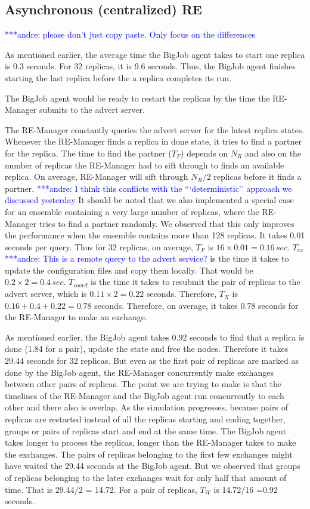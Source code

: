 \documentclass{rspublic}
\newcommand{\alnote}[1]{ {\textcolor{blue} { ***andre: #1 }}}
\newcommand{\alnote}[1]{}
\begin{document}
\subsection{Asynchronous (centralized) RE}
\alnote{please don't just copy paste. Only focus on the differences}

As mentioned earlier, the average time the BigJob agent takes to
start one replica is 0.3 seconds. For 32 replicas, it is 9.6
seconds. Thus, the BigJob agent finishes starting the last replica before the a replica completes its run. 

The BigJob agent
would be ready to restart the replicas by the time the RE-Manager
submits to the advert server. %

The RE-Manager constantly
queries the advert server for the latest replica states. Whenever the
RE-Manager finds a replica in done state, it tries to find a partner
for the replica. The time to find the partner ($T_F$)
depends on $N_R$ and also on the number of replicas the RE-Manager had
to sift through to finds an available replica. On average, RE-Manager
will sift through $N_R/2$ replicas before it finds a partner. \alnote{I think
this conflicts with the ```deterministic'' approach we discussed yesterday} It
should be noted that we also implemented a special case for an ensemble 
containing a very large number of replicas, where the RE-Manager tries to find a
partner randomly. We observed that this only improves the performance
when the ensemble contains more than 128 replicas. It takes 0.01
seconds per query. Thus for 32 replicas, on average, $T_F$ is
$16\times 0.01=0.16\,sec$. 
$T_{ex}$ \alnote{This is a remote query to the advert service?}  is the time it takes to update
the configuration files and copy them locally. That would be
$0.2\times 2=0.4\,sec.$ $T_{coord}$ is the time it takes to
resubmit the pair of replicas to the advert server, which is
$0.11\times 2 = 0.22$ seconds. Therefore, $T_X$ is
$0.16+0.4+0.22=0.78$ seconds. Therefore, on average, it takes 0.78
seconds for the RE-Manager to make an exchange. 

As mentioned earlier, the BigJob agent takes 0.92 seconds to find that
a replica is done (1.84 for a pair), update the state and free the
nodes. Therefore it takes 29.44 seconds for 32 replicas. But even as
the first pair of replicas are marked as done by the BigJob agent, the
RE-Manager concurrently make exchanges between other pairs of
replicas. The point we are trying to make is that the timelines of the
RE-Manager and the BigJob agent run concurrently to each other and there
also is overlap.  As the simulation progresses, because pairs of replicas are restarted instead of
all the replicas starting and ending together, groups or pairs of
replicas start and end at the same time. The BigJob agent takes
longer to process the replicas, longer than the RE-Manager takes to make the
exchanges. The pairs
of replicas belonging to the first few exchanges might have waited the
29.44 seconds at the BigJob agent. But we observed that groups of
replicas belonging to the later exchanges wait for only half that
amount of time. That is 29.44/2 = 14.72. For a pair of replicas, $T_W$ is 14.72/16 =0.92 seconds.
\end{document}
